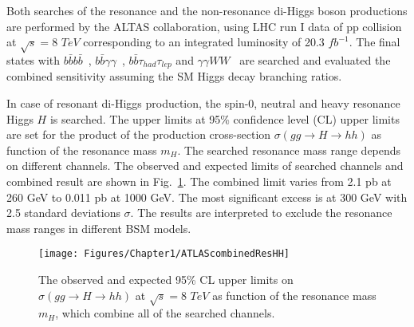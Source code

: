 Both searches of the resonance and the non-resonance di-Higgs boson productions are performed by the ALTAS collaboration, using LHC run I data of pp collision at $\sqrt{s}= 8$ $TeV$ corresponding to an integrated luminosity of 20.3 $fb^{-1}$.
The final states with $b\bar{b}b\bar{b}$~\cite{1506.00285}, $b\bar{b}\gamma\gamma$~\cite{1406.5053}, $b\bar{b}\tau_{had}\tau_{lep}$ and $\gamma\gamma WW$~\cite{1509.04670} are searched and evaluated the combined sensitivity assuming the SM Higgs decay branching ratios.

In case of resonant di-Higgs production, the spin-0, neutral and heavy resonance Higgs $H$ is searched. 
The upper limits at 95\% confidence level (CL) upper limits are set for the product of the production cross-section $\sigma(gg\rightarrow H\rightarrow hh)$ as function of the resonance mass $m_{H}$.
The searched resonance mass range depends on different channels.
The observed and expected limits of searched channels and combined result are shown in Fig.~\ref{fig:ATLAScombinedResHH}.
The combined limit varies from 2.1 pb at 260 GeV to 0.011 pb at 1000 GeV.
The most significant excess is at 300 GeV with 2.5 standard deviations $\sigma$.
The results are interpreted to exclude the resonance mass ranges in different BSM models.

\begin{figure}[h]
  \centering
  \texttt{[image: Figures/Chapter1/ATLAScombinedResHH]}
  \caption{The observed and expected 95\% CL upper limits on $\sigma(gg\rightarrow H\rightarrow hh)$ at $\sqrt{s}= 8$ $TeV$ as function of the resonance mass $m_{H}$, which combine all of the searched channels.~\cite{1509.04670}}
  \label{fig:ATLAScombinedResHH}
\end{figure}



